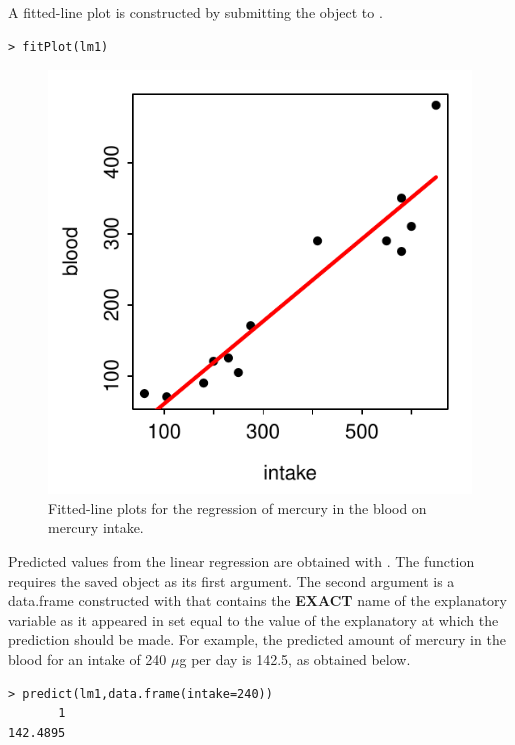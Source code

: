 \documentclass[10pt,openany]{book}\usepackage[]{graphicx}\usepackage[]{color}
\makeatletter
\newenvironment{kframe}{%
 \def\at@end@of@kframe{}%
 \ifinner\ifhmode%
  \def\at@end@of@kframe{\end{minipage}}%
  \begin{minipage}{\columnwidth}%
 \fi\fi%
 \def\FrameCommand##1{\hskip\@totalleftmargin \hskip-\fboxsep
 \colorbox{shadecolor}{##1}\hskip-\fboxsep
     \hskip-\linewidth \hskip-\@totalleftmargin \hskip\columnwidth}%
 \MakeFramed {\advance\hsize-\width
   \@totalleftmargin\z@ \linewidth\hsize
   \@setminipage}}%
 {\par\unskip\endMakeFramed%
 \at@end@of@kframe}
\newenvironment{knitrout}{}{} %
\makeatother
\begin{document}
A fitted-line plot  is constructed by submitting the  object to .

\begin{knitrout}
\color{fgcolor}\begin{kframe}
\begin{verbatim}
> fitPlot(lm1)
\end{verbatim}
\end{kframe}\begin{figure}[hbtp]

{\centering \includegraphics[width=.4\linewidth]{Figs/HGFLP-1} 

}

\caption[Fitted-line plots for the regression of mercury in the blood on mercury intake]{Fitted-line plots for the regression of mercury in the blood on mercury intake.}\label{fig:HGFLP}
\end{figure}


\end{knitrout}

Predicted values from the linear regression are obtained with .  The  function requires the saved  object as its first argument.  The second argument is a data.frame constructed with  that contains the \textbf{EXACT} name of the explanatory variable as it appeared in  set equal to the value of the explanatory at which the prediction should be made.  For example, the predicted amount of mercury in the blood for an intake of 240 $\mu$g per day is 142.5, as obtained below.
\begin{knitrout}
\color{fgcolor}\begin{kframe}
\begin{verbatim}
> predict(lm1,data.frame(intake=240))
       1 
142.4895 
\end{verbatim}
\end{kframe}
\end{knitrout}
\end{document}
